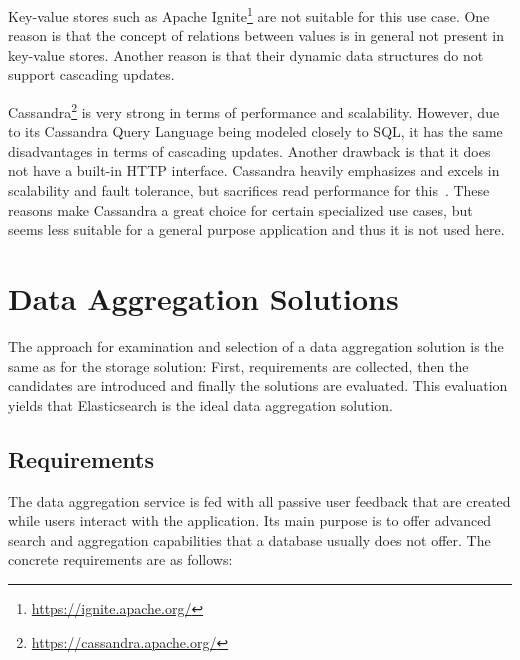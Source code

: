 Key-value stores such as Apache Ignite\footnote{\url{https://ignite.apache.org/}} are not suitable for this use case.
One reason is that the concept of relations between values is in general not present in key-value stores.
Another reason is that their dynamic data structures do not support cascading updates.

Cassandra\footnote{\url{https://cassandra.apache.org/}} is very strong in terms of performance and scalability.
However, due to its Cassandra Query Language being modeled closely to \ac{SQL}, it has the same disadvantages in terms of cascading updates.
Another drawback is that it does not have a built-in HTTP interface.
Cassandra heavily emphasizes and excels in scalability and fault tolerance, but sacrifices read performance for this~\cite{6625441}.
These reasons make Cassandra a great choice for certain specialized use cases, but seems less suitable for a general purpose application and thus it is not used here.

\section{Data Aggregation Solutions}
\label{sec:classifications:aggregation}

The approach for examination and selection of a data aggregation solution is the same as for the storage solution:
First, requirements are collected, then the candidates are introduced and finally the solutions are evaluated.
This evaluation yields that Elasticsearch is the ideal data aggregation solution.


\subsection{Requirements}

The data aggregation service is fed with all passive user feedback that are created while users interact with the application.
Its main purpose is to offer advanced search and aggregation capabilities that a database usually does not offer.
The concrete requirements are as follows:

